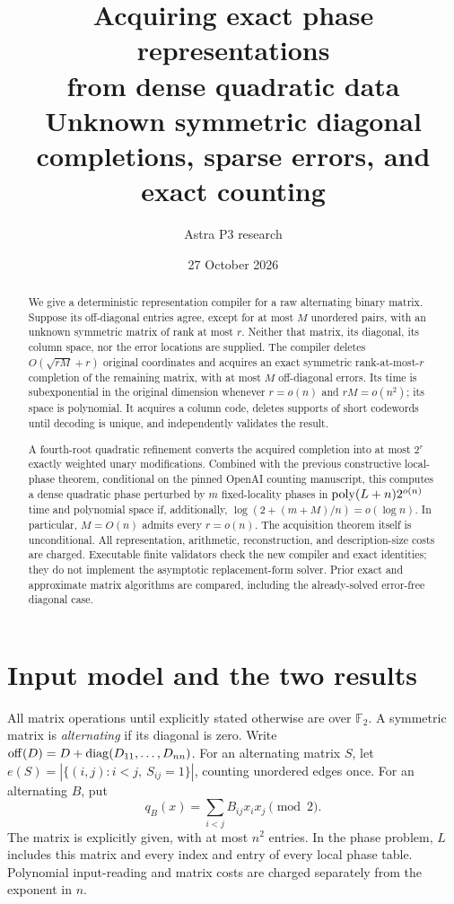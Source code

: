 \documentclass[11pt,a4paper]{article}
\title{Acquiring exact phase representations\\from dense quadratic data\\
\large Unknown symmetric diagonal completions, sparse errors, and exact counting}
\author{Astra P3 research}\date{27 October 2026}
\theoremstyle{remark}\newtheorem{remark}[theorem]{Remark}
\newcommand{\F}{\mathbb F}\newcommand{\Z}{\mathbb Z}\newcommand{\Q}{\mathbb Q}
\newcommand{\off}{\operatorname{off}}\newcommand{\col}{\operatorname{col}}
\begin{document}
\maketitle
\begin{abstract}
We give a deterministic representation compiler for a raw alternating
binary matrix. Suppose its off-diagonal entries agree, except for at
most $M$ unordered pairs, with an unknown symmetric matrix of rank at
most $r$. Neither that matrix, its diagonal, its column space, nor the
error locations are supplied. The compiler deletes
$O(\sqrt{rM}+r)$ original coordinates and acquires an exact symmetric
rank-at-most-$r$ completion of the remaining matrix, with at most $M$
off-diagonal errors. Its time is subexponential in the original dimension
whenever $r=o(n)$ and $rM=o(n^2)$; its space is polynomial. It acquires a
column code, deletes supports of short codewords until decoding is
unique, and independently validates the result.

A fourth-root quadratic refinement converts the acquired completion into
at most $2^r$ exactly weighted unary modifications. Combined with the
previous constructive local-phase theorem, conditional on the pinned
OpenAI counting manuscript, this computes a dense quadratic phase
perturbed by $m$ fixed-locality phases in
$\operatorname{poly}(L+n)2^{o(n)}$ time and polynomial space if, additionally,
$\log(2+(m+M)/n)=o(\log n)$. In particular, $M=O(n)$ admits
every $r=o(n)$. The acquisition theorem itself is unconditional.
All representation, arithmetic, reconstruction, and description-size
costs are charged. Executable finite validators check the new compiler
and exact identities; they do not implement the asymptotic
replacement-form solver. Prior exact and approximate matrix algorithms
are compared, including the already-solved error-free diagonal case.
\end{abstract}

\section{Input model and the two results}
All matrix operations until explicitly stated otherwise are over $\F_2$.
A symmetric matrix is \emph{alternating} if its diagonal is zero. Write
$\off(D)=D+\diag(D_{11},\ldots,D_{nn})$. For an alternating matrix $S$,
let $e(S)=|\{(i,j):i<j,\ S_{ij}=1\}|$, counting unordered edges once.
For an alternating $B$, put
\[
q_B(x)=\sum_{i<j}B_{ij}x_ix_j\pmod2.
\]
The matrix is explicitly given, with at most $n^2$ entries. In the
phase problem, $L$ includes this matrix and every index and entry of
every local phase table. Polynomial input-reading and matrix costs
are charged separately from the exponent in $n$.
\end{document}
